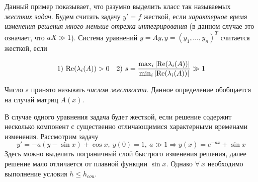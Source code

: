 Данный пример показывает, что разумно выделить класс так называемых \textit{жестких
  задач}. Будем считать задачу $y'=f$ жесткой, если \textit{характерное время изменения
  решения много меньше отрезка интегрирования} (в данном случае это означает,
что $aX \gg 1$). Система уравнений $y = Ay, y = (y_1,\ldots,y_n)^T$ считается жесткой,
если

\[
  1)\ \text{Re}(\lambda_i(A))>0 \quad
  2)\ s=\frac{\max_i\abs{\text{Re}(\lambda_i(A))}}{\min_i\abs{\text{Re}(\lambda_i(A))}} \gg 1
\]

Число $s$ принято называть \textit{числом жесткости}. Данное определение обобщается на случай матриц $A(x)$.

В случае одного уравнения задача будет жесткой, если решение содержит
несколько компонент с существенно отличающимися характерными
временами изменения. Рассмотрим задачу
\[y' = -a(y-\sin x)+\cos x,\ y(0) = 1,\ a \gg 1\Rightarrow y(x) = e^{-ax} + \sin x\]
Здесь можно выделить пограничный слой быстрого изменения решения, далее решение
мало отличается от плавной функции $\sin x$. Однако $\forall\ x$ необходимо выполнение условия $h \leq h_{cou}$.

